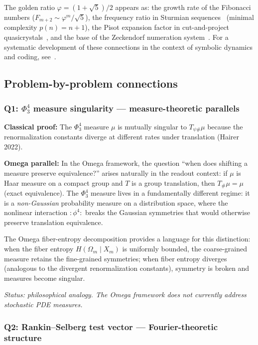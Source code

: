 The golden ratio $\varphi=(1+\sqrt5)/2$ appears as:
the growth rate of the Fibonacci numbers ($F_{m+2}\sim\varphi^m/\sqrt5$),
the frequency ratio in Sturmian sequences~\cite{morse-hedlund1940}
(minimal complexity $p(n)=n+1$),
the Pisot expansion factor in cut-and-project
quasicrystals~\cite{baake-grimm2013},
and the base of the Zeckendorf numeration system~\cite{omega-fop}.
For a systematic development of these connections in the context of
symbolic dynamics and coding, see~\cite{lind-marcus1995}.

\subsection{Problem-by-problem connections}

\subsubsection*{Q1: $\Phi^4_3$ measure singularity --- measure-theoretic parallels}

\noindent\textbf{Classical proof:} The $\Phi^4_3$ measure $\mu$ is
mutually singular to $T_{\psi\#}\mu$ because the renormalization
constants diverge at different rates under translation (Hairer 2022).

\noindent\textbf{Omega parallel:}
In the Omega framework, the question ``when does shifting a measure
preserve equivalence?'' arises naturally in the readout context:
if $\mu$ is Haar measure on a compact group and $T$ is a group
translation, then $T_\#\mu=\mu$ (exact equivalence).
The $\Phi^4_3$ measure lives in a fundamentally different regime:
it is a \emph{non-Gaussian} probability measure on a distribution space,
where the nonlinear interaction $:\!\phi^4\!:$ breaks the Gaussian
symmetries that would otherwise preserve translation equivalence.

The Omega fiber-entropy decomposition provides a language for this
distinction: when the fiber entropy $H(\Omega_m\mid X_m)$ is uniformly
bounded, the coarse-grained measure retains the fine-grained symmetries;
when fiber entropy diverges (analogous to the divergent renormalization
constants), symmetry is broken and measures become singular.

\emph{Status: philosophical analogy.  The Omega framework does not
currently address stochastic PDE measures.}

\subsubsection*{Q2: Rankin--Selberg test vector --- Fourier-theoretic structure}

